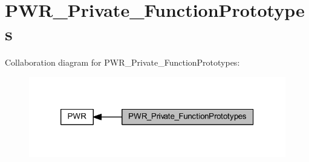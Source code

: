 \hypertarget{group___p_w_r___private___function_prototypes}{}\section{P\+W\+R\+\_\+\+Private\+\_\+\+Function\+Prototypes}
\label{group___p_w_r___private___function_prototypes}
Collaboration diagram for P\+W\+R\+\_\+\+Private\+\_\+\+Function\+Prototypes\+:
\nopagebreak
\begin{figure}[H]
\begin{center}
\leavevmode
\includegraphics[width=320pt]{group___p_w_r___private___function_prototypes}
\end{center}
\end{figure}
